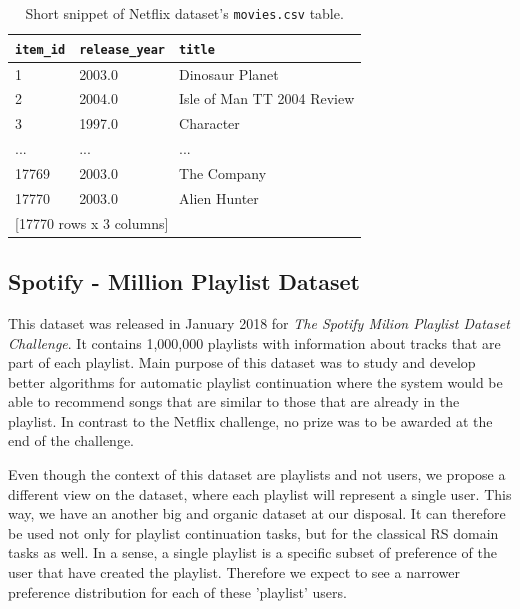 \begin{table}[!ht]
    \centering
    \begin{tabular}{ l l l }
        \verb|item_id| & \verb|release_year| & \verb|title| \\
        \hline
            1 &       2003.0 &            Dinosaur Planet    \\
            2 &       2004.0 & Isle of Man TT 2004 Review    \\
            3 &       1997.0 &                  Character    \\
          ... &          ... &                        ...    \\
        17769 &       2003.0 &                The Company    \\
        17770 &       2003.0 &               Alien Hunter \\ [1mm]
        \multicolumn{3}{l}{{[17770 rows x 3 columns]}}
    \end{tabular}
    \caption{Short snippet of Netflix dataset's \texttt{movies.csv} table.}
    \label{table:5.1_Netflix_movies}
\end{table}
\subsection{Spotify - Million Playlist Dataset}
This dataset was released in January 2018 for \textit{The Spotify Milion Playlist Dataset Challenge}. It contains 1,000,000 playlists with information about tracks that are part of each playlist. Main purpose of this dataset was to study and develop better algorithms for automatic playlist continuation where the system would be able to recommend songs that are similar to those that are already in the playlist. In contrast to the Netflix challenge, no prize was to be awarded at the end of the challenge.

Even though the context of this dataset are playlists and not users, we propose a different view on the dataset, where each playlist will represent a single user. This way, we have an another big and organic dataset at our disposal. It can therefore be used not only for playlist continuation tasks, but for the classical RS domain tasks as well. In a sense, a single playlist is a specific subset of preference of the user that have created the playlist. Therefore we expect to see a narrower preference distribution for each of these 'playlist' users.

